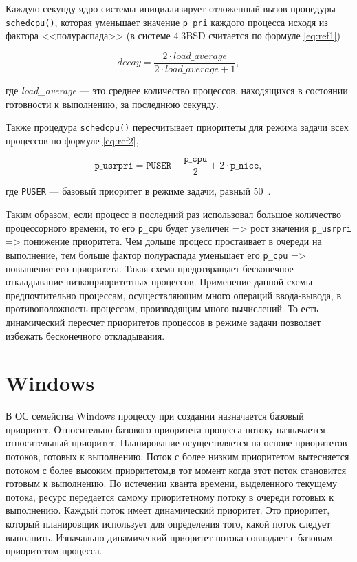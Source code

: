 Каждую секунду ядро системы инициализирует отложенный вызов процедуры \texttt{schedcpu()}, которая уменьшает значение \texttt{p\_pri} каждого процесса исходя из фактора <<полураспада>> (в системе 4.3BSD считается по формуле \ref{eq:ref1})

\begin{equation}
\label{eq:ref1}
decay = \frac{2 \cdot load\_average}{2 \cdot load\_average + 1},
\end{equation}

где
\textit{load\_average} --- это среднее количество процессов, находящихся в состоянии готовности к выполнению, за последнюю секунду.

Также процедура \texttt{schedcpu()} пересчитывает приоритеты для режима задачи
всех процессов по формуле \ref{eq:ref2},

\begin{equation}
\label{eq:ref2}
\texttt{p\_usrpri} = \texttt{PUSER} + \frac{\texttt{p\_cpu}}{2} + 2 \cdot \texttt{p\_nice},
\end{equation}

где \texttt{PUSER} --- базовый приоритет в режиме задачи, равный 50~\cite{unix}.

Таким образом, если процесс в последний раз использовал большое количество процессорного времени, то его \texttt{р\_срu} будет увеличен => рост значения \texttt{p\_usrpri} => понижение приоритета.  Чем дольше процесс простаивает в очереди на выполнение, тем больше фактор полураспада уменьшает его \texttt{р\_срu} => повышение его приоритета. Такая схема предотвращает бесконечное откладывание низкоприоритетных процессов. Применение данной схемы предпочтительно процессам, осуществляющим много операций ввода-вывода, в противоположность процессам, производящим много вычислений. То есть динамический пересчет приоритетов процессов в режиме задачи позволяет избежать бесконечного откладывания.

\section{Windows}
В ОС семейства Windows  процессу при создании назначается базовый приоритет. Относительно
базового приоритета процесса потоку назначается относительный приоритет. Планирование осуществляется на основе приоритетов потоков, готовых к выполнению. Поток с более низким приоритетом 
вытесняется потоком с более высоким приоритетом,в тот момент когда этот поток становится готовым к выполнению. По истечении кванта времени, выделенного 
текущему потока, ресурс передается самому приоритетному потоку в очереди готовых к выполнению. Каждый поток имеет динамический приоритет. Это приоритет, который планировщик использует для определения того, какой поток следует 
выполнить. Изначально динамический приоритет потока совпадает с базовым приоритетом процесса.

